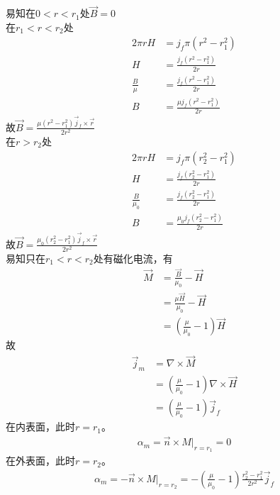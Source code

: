 \documentclass{phyasgn}
\begin{document}
\begin{sol}[2]
    易知在$0<r<r_1$处$\vec{B}=0$\\
    在$r_1<r<r_2$处
    \begin{align*}
      2\pi rH&=j_f\pi(r^2-r_1^2)\\
      H&=\frac{j_f(r^2-r_1^2)}{2r}\\
      \frac{B}{\mu}&=\frac{j_f(r^2-r_1^2)}{2r}\\
      B&=\frac{\mu j_f(r^2-r_1^2)}{2r}
    \end{align*}
    故$\vec{B}=\frac{\mu (r^2-r_1^2)\vec{j}_f\times\vec{r}}{2r^2}$\\
    在$r>r_2$处
    \begin{align*}
        2\pi rH&=j_f\pi(r_2^2-r_1^2)\\
        H&=\frac{j_f(r_2^2-r_1^2)}{2r}\\
        \frac{B}{\mu_0}&=\frac{j_f(r_2^2-r_1^2)}{2r}\\
        B&=\frac{\mu_0 j_f(r_2^2-r_1^2)}{2r}
      \end{align*}
      故$\vec{B}=\frac{\mu_0 (r_2^2-r_1^2)\vec{j}_f\times\vec{r}}{2r^2}$\\
    易知只在$r_1<r<r_2$处有磁化电流，有
    \begin{align*}
      \vec{M}&=\frac{\vec{B}}{\mu_0}-\vec{H}\\
      &=\frac{\mu\vec{H}}{\mu_0}-\vec{H}\\
      &=(\frac{\mu}{\mu_0}-1)\vec{H}
    \end{align*}
    故
    \begin{align*}
      \vec{j}_m&=\nabla\times\vec{M}\\
      &=(\frac{\mu}{\mu_0}-1)\nabla\times\vec{H}\\
      &=(\frac{\mu}{\mu_0}-1)\vec{j}_f
    \end{align*}
    在内表面，此时$r=r_1$。
    \begin{align*}
      \alpha_m=\vec{n}\times M|_{r=r_1}=0
    \end{align*}
    在外表面，此时$r=r_2$。
    \begin{align*}
        \alpha_m=-\vec{n}\times M|_{r=r_2}=-(\frac{\mu}{\mu_0}-1)\frac{r_2^2-r_1^2}{2r^2}\vec{j}_f
    \end{align*}
\end{sol}\par
\end{document}
